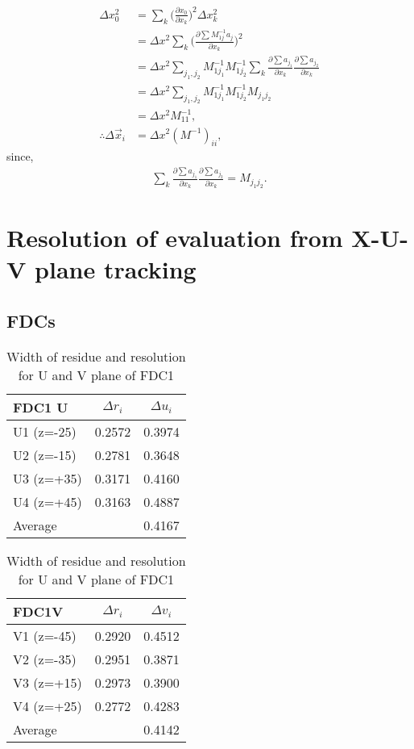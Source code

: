 \begin{align}
\Delta x^2_0 &= \sum_{k}\bigg( \frac{\partial x_0}{\partial x_k} \bigg)^2 \Delta x_k^2 \\
            &= \Delta x^2 \sum_{k} \bigg( \frac{\partial \sum M^{-1}_{1j} a_j}{\partial x_k}\bigg)^2\\
            &= \Delta x^2 \sum_{j_1,j_2} M^{-1}_{1j_1} M^{-1}_{1j_2} \sum_k \frac{\partial\sum a_{j_1}}{\partial x_k} \frac{\partial \sum a_{j_2}}{\partial x_k}   \\
            &= \Delta x^2 \sum_{j_1,j_2} M^{-1}_{1j_1} M^{-1}_{1j_2} M_{j_1j_2}\\
            &= \Delta x^2 M^{-1}_{11},\\ 
\therefore \Delta \vec{x}_i &= \Delta x^2 (M^{-1})_{ii},
\end{align}
since,
\begin{align}
    \sum_k \frac{\partial \sum a_{j_1}}{\partial x_k} \frac{\partial \sum a_{j_2}}{\partial x_k} = M_{j_1j_2}.
\end{align}
\clearpage

\section{Resolution of evaluation from X-U-V plane tracking}

\subsection{FDCs}

\begin{table}[h]
    \centering
    \begin{tabular}{l|cc}
    \hline
      FDC1 U  & $\Delta r_i$ & $\Delta u_i$  \\
    \hline
        U1 (z=-25) &  0.2572 & 0.3974       \\
        U2 (z=-15) &  0.2781 & 0.3648      \\
        U3 (z=+35) &  0.3171 & 0.4160     \\
        U4 (z=+45) &  0.3163 & 0.4887      \\
    \hline
    Average &        &   0.4167 \\
    \hline
    \end{tabular}
    \begin{tabular}{l|cc}
    \hline
      FDC1V  & $\Delta r_i$ & $\Delta v_i$ \\
    \hline
        V1 (z=-45) & 0.2920 & 0.4512 \\
        V2 (z=-35) & 0.2951 & 0.3871 \\
        V3 (z=+15) & 0.2973 & 0.3900 \\
        V4 (z=+25) & 0.2772 & 0.4283 \\
    \hline
    Average &        & 0.4142 \\
    \hline
    \end{tabular}
    \caption{Width of residue and resolution for U and V plane of FDC1}
\end{table}

